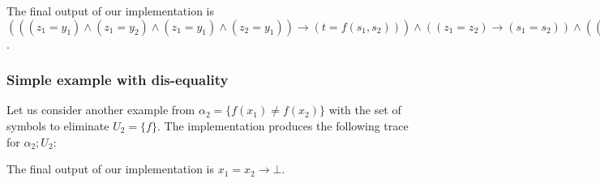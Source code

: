 


The final output of our implementation is $(((z_1 = y_1) \land (z_1 = y_2) \land (z_1 = y_1) \land (z_2 = y_1)) \rightarrow (t = f(s_1, s_2))) \land
        ( (z_1 = z_2) \rightarrow (s_1 = s_2)) \land
        ( ((z_2 = y_1) \land (z_1 = y_2) \land (z_1 = y_1) \land (z_2 = y_1)) \rightarrow (t = f(s_2, s_2))) \land
        ( ((z_2 = y_1) \land (z_1 = y_2)) \rightarrow (t = f(s_2, s_1))) \land
        (((z_1 = y_1) \land (z_1 = y_2)) \rightarrow (t = f(s_1, s_1)))$.

\subsubsection{Simple example with dis-equality}

Let us consider another example from \cite{KAPUR2017} 
$\alpha_2 = \{f(x_1) \neq f(x_2)\}$
with the set of symbols to eliminate $U_2 = \{f\}$. The implementation produces the following
trace for $\alpha_2; U_2$:



The final output of our implementation is $x_1 = x_2 \rightarrow \bot$.







